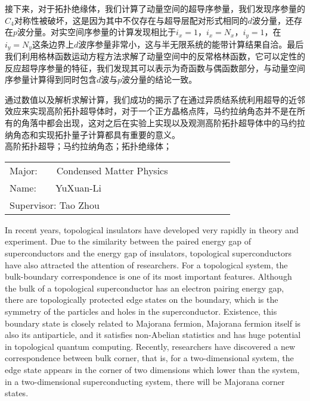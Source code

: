  接下来，对于拓扑绝缘体，我们计算了动量空间的超导序参量，我们发现序参量的$C_4$对称性被破坏，这是因为其中不仅存在与超导层配对形式相同的$d$波分量，还存在$p$波分量。对实空间序参量的计算发现相比于$i_x=1$，$i_x=N_x$，$i_y=1$，在$i_y=N_y$这条边界上$d$波序参量非常小，这与半无限系统的能带计算结果自洽。最后我们利用格林函数运动方程方法求解了动量空间中的反常格林函数，它可以定性的反应超导序参量的特征，我们发现其可以表示为奇函数与偶函数部分，与动量空间序参量计算得到同时包含$d$波与$p$波分量的结论一致。
 
 通过数值以及解析求解计算，我们成功的揭示了在通过异质结系统利用超导的近邻效应来实现高阶拓扑超导体时，对于一个正方晶格点阵，马约拉纳角态并不是在所有的角落中都会出现，这对之后在实验上实现以及观测高阶拓扑超导体中的马约拉纳角态和实现拓扑量子计算都具有重要的意义。\\
\quad{}高阶拓扑超导；马约拉纳角态；拓扑绝缘体；

\newpage
{\centering {}}
\bigskip
{
	\begin{center}
		\begin{tabular}{l}
			Major:$\quad\quad$Condensed Matter Physics$\quad\qquad$$\quad\qquad$\\
			Name:$\quad\quad$YuXuan-Li$\quad\qquad$$\quad\qquad$\\
			Supervisor: Tao Zhou$\quad\qquad$\\
		\end{tabular}
\end{center}}
\bigskip
\bigskip
\bigskip

{}

 In recent years, topological insulators have developed very rapidly in theory and experiment. Due to the similarity between the paired energy gap of superconductors and the energy gap of insulators, topological superconductors have also attracted the attention of researchers. For a topological system, the bulk-boundary correspondence is one of its most important features.  Although the bulk of a topological superconductor has an electron pairing energy gap, there are topologically protected edge states on the boundary, which is the symmetry of the particles and holes in the superconductor. Existence, this boundary state is closely related to Majorana fermion, Majorana fermion itself is also its antiparticle, and it satisfies non-Abelian statistics and has huge potential in topological quantum computing. Recently, researchers have discovered a new correspondence between bulk corner, that is, for a two-dimensional system, the edge state  appears in the corner of two dimensions which lower than the system, in a two-dimensional superconducting system, there will be Majorana corner states. 
 
